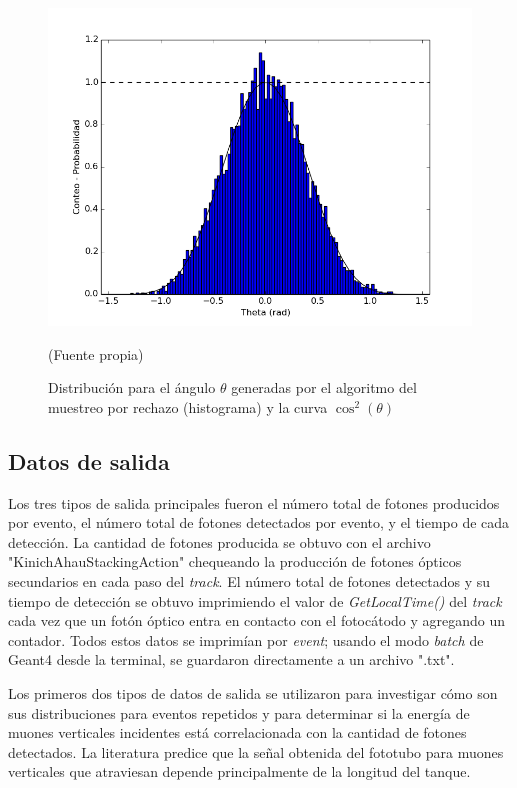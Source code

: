 \documentclass{book}
\begin{document}
\begin{figure}[h] %
\begin{center}
 \includegraphics[width=\linewidth]{ThetaDist.png}

(Fuente propia)
\caption{Distribuci\'on para el \'angulo $\theta$ generadas por el algoritmo del muestreo por rechazo (histograma) y la curva $\cos^2(\theta)$}
\end{center}
\end{figure}

\subsection{Datos de salida}

Los tres tipos de salida principales fueron el n\'umero total de fotones producidos por evento, el n\'umero total de fotones detectados por evento, y el tiempo de cada detecci\'on. La cantidad de fotones producida se obtuvo con el archivo "KinichAhauStackingAction" chequeando la producci\'on de fotones \'opticos secundarios en cada paso del \textit{track}. El n\'umero total de fotones detectados y su tiempo de detecci\'on se obtuvo imprimiendo el valor de \textit{GetLocalTime()} del \textit{track} cada vez que un fot\'on \'optico entra en contacto con el fotoc\'atodo y agregando un contador. Todos estos datos se imprim\'ian por \textit{event}; usando el modo \textit{batch} de Geant4 desde la terminal, se guardaron directamente a un archivo ".txt".

Los primeros dos tipos de datos de salida se utilizaron para investigar c\'omo son sus distribuciones para eventos repetidos y para determinar si la energ\'ia de muones verticales incidentes est\'a correlacionada con la cantidad de fotones detectados. La literatura predice que la se\~nal obtenida del fototubo para muones verticales que atraviesan depende principalmente de la longitud del tanque.
\end{document}
